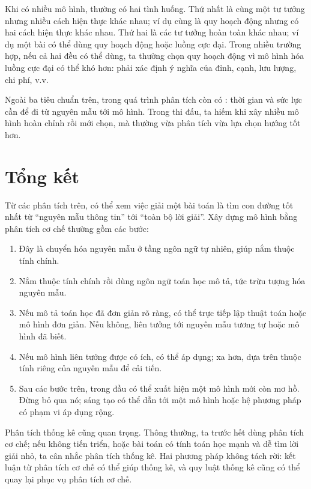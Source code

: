\documentclass[11pt]{article}
\begin{document}
Khi có nhiều mô hình, thường có hai tình huống. Thứ nhất là cùng một tư tưởng
nhưng nhiều cách hiện thực khác nhau; ví dụ cùng là quy hoạch động nhưng có
hai cách hiện thực khác nhau. Thứ hai là các tư tưởng hoàn toàn khác nhau; ví
dụ một bài có thể dùng quy hoạch động hoặc luồng cực đại. Trong nhiều trường
hợp, nếu cả hai đều có thể dùng, ta thường chọn quy hoạch động vì mô hình hóa
luồng cực đại có thể khó hơn: phải xác định ý nghĩa của đỉnh, cạnh, lưu lượng,
chi phí, v.v.

Ngoài ba tiêu chuẩn trên, trong quá trình phân tích còn có : thời gian và sức lực cần để đi từ nguyên mẫu tới mô hình. Trong thi
đấu, ta hiếm khi xây nhiều mô hình hoàn chỉnh rồi mới chọn, mà thường vừa
phân tích vừa lựa chọn hướng tốt hơn.

\section{Tổng kết}

Từ các phân tích trên, có thể xem việc giải một bài toán là tìm con đường tốt
nhất từ ``nguyên mẫu thông tin'' tới ``toàn bộ lời giải''. Xây dựng mô hình
bằng phân tích cơ chế thường gồm các bước:
\begin{enumerate}
  \item {} Đây là chuyển hóa
  nguyên mẫu ở tầng ngôn ngữ tự nhiên, giúp nắm thuộc tính chính.
  \item {} Nắm thuộc tính chính rồi
  dùng ngôn ngữ toán học mô tả, tức trừu tượng hóa nguyên mẫu.
  \item {} Nếu mô tả toán học đã đơn giản
  rõ ràng, có thể trực tiếp lập thuật toán hoặc mô hình đơn giản. Nếu không,
  liên tưởng tới nguyên mẫu tương tự hoặc mô hình đã biết.
  \item {} Nếu mô hình liên tưởng được có ích, có
  thể áp dụng; xa hơn, dựa trên thuộc tính riêng của nguyên mẫu để cải tiến.
  \item {} Sau các bước trên, trong đầu có thể xuất
  hiện một mô hình mới còn mơ hồ. Đừng bỏ qua nó; sáng tạo có thể dẫn tới một
  mô hình hoặc hệ phương pháp có phạm vi áp dụng rộng.
\end{enumerate}

Phân tích thống kê cũng quan trọng. Thông thường, ta trước hết dùng phân tích
cơ chế; nếu không tiến triển, hoặc bài toán có tính toán học mạnh và dễ tìm
lời giải nhỏ, ta cân nhắc phân tích thống kê. Hai phương pháp không tách rời:
kết luận từ phân tích cơ chế có thể giúp thống kê, và quy luật thống kê cũng
có thể quay lại phục vụ phân tích cơ chế.
\end{document}
